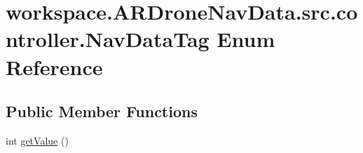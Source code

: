 \hypertarget{enumworkspace_1_1_a_r_drone_nav_data_1_1src_1_1controller_1_1_nav_data_tag}{}\section{workspace.\+A\+R\+Drone\+Nav\+Data.\+src.\+controller.\+Nav\+Data\+Tag Enum Reference}
\label{enumworkspace_1_1_a_r_drone_nav_data_1_1src_1_1controller_1_1_nav_data_tag}
\subsection*{Public Member Functions}
\begin{DoxyCompactItemize}
\item 
int \hyperlink{enumworkspace_1_1_a_r_drone_nav_data_1_1src_1_1controller_1_1_nav_data_tag_ad613a9c6fb9c23ac8a2ca58e6af82452}{get\+Value} ()
\end{DoxyCompactItemize}
